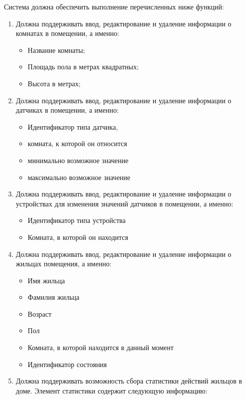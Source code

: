       Система должна обеспечить выполнение перечисленных ниже функций:
      \begin{enumerate}
        \item Должна поддерживать ввод, редактирование и удаление информации о комнатах в помещении, а именно:
          \begin{itemize}
            \item Название комнаты;
            \item Площадь пола в метрах квадратных;
            \item Высота в метрах;
          \end{itemize}
        \item Должна поддерживать ввод, редактирование и удаление информации о датчиках в помещении, а именно:
          \begin{itemize}
            \item Идентификатор типа датчика,
            \item комната, к которой он относится
            \item минимально возможное значение
            \item максимально возможное значение
          \end{itemize}
        \item Должна поддерживать ввод, редактирование и удаление информации о устройствах для изменения значений датчиков в помещении, а именно:
          \begin{itemize}
            \item Идентификатор типа устройства
            \item Комната, в которой он находится
          \end{itemize}
        \item Должна поддерживать ввод, редактирование и удаление информации о жильцах помещения, а именно:
          \begin{itemize}
            \item Имя жильца 
            \item Фамилия жильца
            \item Возраст
            \item Пол
            \item Комната, в которой находится в данный момент
            \item Идентификатор состояния
          \end{itemize}
        \item Должна поддерживать возможность сбора статистики действий жильцов в доме. Элемент статистики содержит следующую информацию: 

\end{enumerate}

